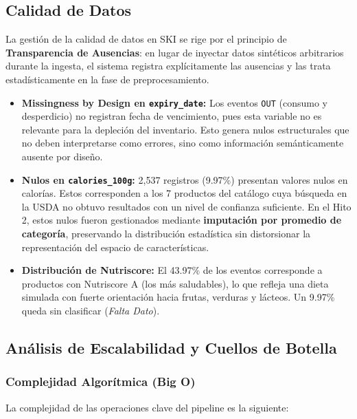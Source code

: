 \documentclass[12pt,a4paper]{article}
\newcommand{\code}[1]{\texttt{\small #1}}
\begin{document}
\subsection{Calidad de Datos}

La gestión de la calidad de datos en SKI se rige por el principio de \textbf{Transparencia de Ausencias}: en lugar de inyectar datos sintéticos arbitrarios durante la ingesta, el sistema registra explícitamente las ausencias y las trata estadísticamente en la fase de preprocesamiento.

\begin{itemize}
    \item \textbf{Missingness by Design en \code{expiry\_date}:} Los eventos \code{OUT} (consumo y desperdicio) no registran fecha de vencimiento, pues esta variable no es relevante para la depleción del inventario. Esto genera nulos estructurales que no deben interpretarse como errores, sino como información semánticamente ausente por diseño.

    \item \textbf{Nulos en \code{calories\_100g}:} 2{,}537 registros (9.97\%) presentan valores nulos en calorías. Estos corresponden a los 7 productos del catálogo cuya búsqueda en la USDA no obtuvo resultados con un nivel de confianza suficiente. En el Hito 2, estos nulos fueron gestionados mediante \textbf{imputación por promedio de categoría}, preservando la distribución estadística sin distorsionar la representación del espacio de características.

    \item \textbf{Distribución de Nutriscore:} El 43.97\% de los eventos corresponde a productos con Nutriscore A (los más saludables), lo que refleja una dieta simulada con fuerte orientación hacia frutas, verduras y lácteos. Un 9.97\% queda sin clasificar (\textit{Falta Dato}).
\end{itemize}

\subsection{Análisis de Escalabilidad y Cuellos de Botella}

\subsubsection{Complejidad Algorítmica (Big O)}

La complejidad de las operaciones clave del pipeline es la siguiente:
\end{document}
